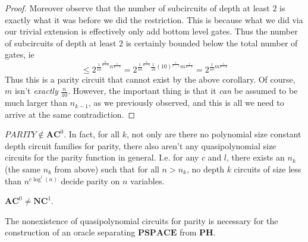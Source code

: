 \begin{proof}
Moreover observe that the number of subcircuits of depth at least $2$ is exactly what it was before we did the restriction. This is because what we did via our trivial extension is effectively only add bottom level gates. Thus the number of subcircuits of depth at least $2$ is certainly bounded below the total number of gates, ie
\[ \leq 2^{\frac{1}{10}^{\frac{k}{k-1}}n^{\frac{1}{k-1}}} = 2^{\frac{1}{10}^{\frac{1}{k-1}}\frac{1}{10}(10)^{\frac{1}{k-1}}m^{\frac{1}{k-1}}} = 2^{\frac{1}{10}m^{\frac{1}{k-1}}} \]
Thus this is a parity circuit that cannot exist by the above corollary. Of course, $m$ isn't \emph{exactly} $\frac{n}{10}$. However, the important thing is that it \emph{can} be assumed to be much larger than $n_{k-1}$, as we previously observed, and this is all we need to arrive at the same contradiction.	
\end{proof}
\begin{corollary}
	$PARITY \notin \bm{AC}^0$. In fact, for all $k$, not only are there no polynomial size constant depth circuit families for parity, there also aren't any quasipolynomial size circuits for the parity function in general. I.e. for any $c$ and $l$, there exists an $n_k$ (the same $n_k$ from above) such that for all $n > n_k$, no depth $k$ circuits of size less than $n^{c\log^l(n)}$ decide parity on $n$ variables.
\end{corollary}
\begin{corollary}
	$\bm{AC}^0 \neq \bm{NC}^1$.
\end{corollary}
The nonexistence of quasipolynomial circuits for parity is necessary for the construction of an oracle separating $\bm{PSPACE}$ from $\bm{PH}$. 
